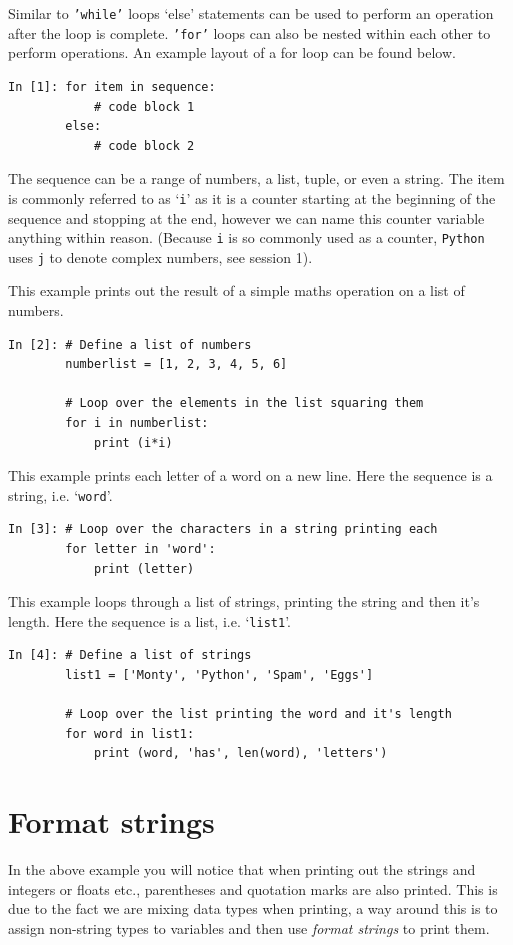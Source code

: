 \noindent Similar to \texttt{'while'} loops `else' statements can be used to perform an operation after the loop is complete. \texttt{'for'} loops can also be nested within each other to perform operations. An example layout of a for loop can be found below.

\begin{lstlisting}[style=PY]
In [1]: for item in sequence:
	        # code block 1
        else:
	        # code block 2
\end{lstlisting}
The sequence can be a range of numbers, a list, tuple, or even a string. The item is commonly referred to as `\texttt{i}' as it is a counter starting at the beginning of the sequence and stopping at the end, however we can name this counter variable anything within reason. (Because {\tt i} is so commonly used as a counter, \texttt{Python} uses {\tt j} to denote complex numbers, see session 1). \\

\newpage

\noindent This example prints out the result of a simple maths operation on a list of numbers.
\begin{lstlisting}[style=PY]
In [2]: # Define a list of numbers
        numberlist = [1, 2, 3, 4, 5, 6]
        
        # Loop over the elements in the list squaring them
        for i in numberlist:
            print (i*i)
\end{lstlisting}
This example prints each letter of a word on a new line. Here the sequence is a string, i.e. `{\tt word}'.

\begin{lstlisting}[style=PY]
In [3]: # Loop over the characters in a string printing each
        for letter in 'word':
            print (letter)
\end{lstlisting}
This example loops through a list of strings, printing the string and then it's length. Here the sequence is a list, i.e. `{\tt list1}'.
\begin{lstlisting}[style=PY]
In [4]: # Define a list of strings
        list1 = ['Monty', 'Python', 'Spam', 'Eggs']
        
        # Loop over the list printing the word and it's length
        for word in list1:
            print (word, 'has', len(word), 'letters')
\end{lstlisting}

\section{Format strings}
In the above example you will notice that when printing out the strings and integers or floats etc., parentheses and quotation marks are also printed. This is due to the fact we are mixing data types when printing, a way around this is to assign non-string types to variables and then use \emph{format strings} to print them.


